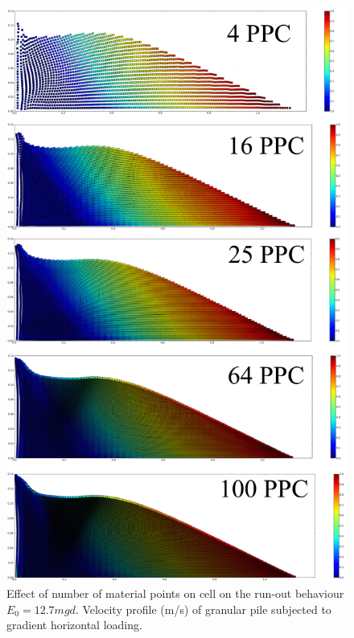 \begin{figure}[tbhp]
\centering
\includegraphics[height=0.9\textheight]{MPM_50ppc}
\caption{Effect of number of material points on cell on the run-out behaviour 
$E_0=12.7mgd$. 
Velocity profile (\si{\m/\s}) of granular pile subjected to gradient horizontal 
loading.}
\label{fig:MPM_50ppc}
\end{figure}


